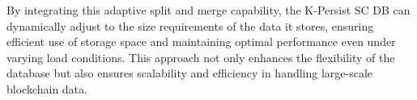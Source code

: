 By integrating this adaptive split and merge capability, the K-Persist SC DB can dynamically adjust to the size requirements of the data it stores, ensuring efficient use of storage space and maintaining optimal performance even under varying load conditions. This approach not only enhances the flexibility of the database but also ensures scalability and efficiency in handling large-scale blockchain data.